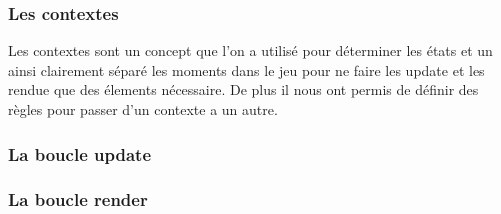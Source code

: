 \subsubsection{Les contextes}

Les contextes sont un concept que l'on a utilisé pour déterminer les états et un ainsi clairement séparé les moments dans le jeu pour ne faire les update et les rendue que des élements nécessaire.
\ml
De plus il nous ont permis de définir des règles pour passer d'un contexte a un autre.


\subsubsection{La boucle update}

\subsubsection{La boucle render}